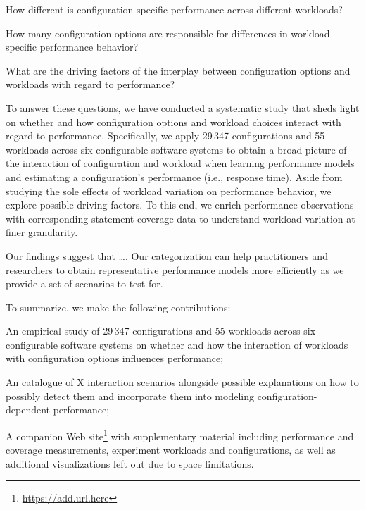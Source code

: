 \begin{compactitem}
	\item How different is configuration-specific performance across different workloads? 
	\item How many configuration options are responsible for differences in workload-specific performance behavior?
	\item What are the driving factors of the interplay between configuration options and workloads with regard to performance? 
\end{compactitem}

To answer these questions, we have conducted a systematic study that sheds light on whether and how configuration options and workload choices interact with regard to performance. 
Specifically, we apply 29\,347 configurations and 55 workloads across six configurable software systems to obtain a broad picture of the interaction of configuration and workload when learning performance models and estimating a configuration's performance (i.e., response time). Aside from studying the sole effects of workload variation on performance behavior, we explore possible driving factors. To this end, we enrich performance observations with corresponding statement coverage data to understand workload variation at finer granularity.

Our findings suggest that {\color{red} \ldots. Our categorization can help practitioners and researchers to obtain representative performance models more efficiently as we provide a set of scenarios to test for.}

To summarize, we make the following contributions: 

\begin{compactitem}
	\item An empirical study of 29\,347 configurations and 55 workloads across six configurable software systems on whether and how the interaction of workloads with configuration options influences performance;
	
	\item {An catalogue of \color{red}X interaction scenarios alongside possible explanations on how to possibly detect them and incorporate them into modeling configuration-dependent performance;}
	
	\item A companion Web site\footnote{\url{https://add.url.here}} with supplementary material including performance and coverage measurements, experiment workloads and configurations, as well as additional visualizations left out due to space limitations.
\end{compactitem}


